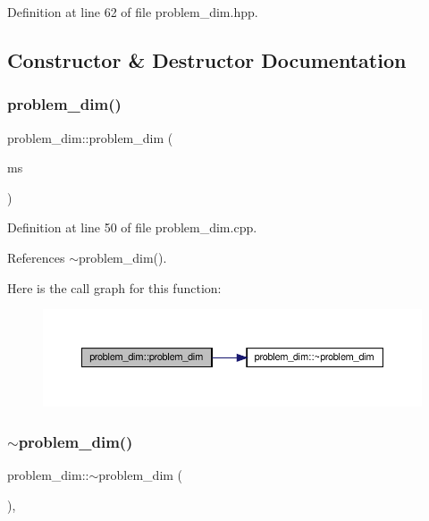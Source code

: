 Definition at line 62 of file problem\+\_\+dim.\+hpp.



\subsection{Constructor \& Destructor Documentation}
\mbox{\label{classproblem__dim_ac87600d07dd0aaa1b253baf90e987397}} 
\subsubsection{\texorpdfstring{problem\+\_\+dim()}{problem\_dim()}}
{\footnotesize\ttfamily problem\+\_\+dim\+::problem\+\_\+dim (\begin{DoxyParamCaption}\item[{meilp\+\_\+solver\+Ref}]{ms }\end{DoxyParamCaption})\hspace{0.3cm}{\ttfamily [explicit]}}



Definition at line 50 of file problem\+\_\+dim.\+cpp.



References $\sim$problem\+\_\+dim().

Here is the call graph for this function\+:
\nopagebreak
\begin{figure}[H]
\begin{center}
\leavevmode
\includegraphics[width=350pt]{d6/d56/classproblem__dim_ac87600d07dd0aaa1b253baf90e987397_cgraph}
\end{center}
\end{figure}
\mbox{\label{classproblem__dim_ae901efbb896887db42654cea94c2f72e}} 
\subsubsection{\texorpdfstring{$\sim$problem\+\_\+dim()}{~problem\_dim()}}
{\footnotesize\ttfamily problem\+\_\+dim\+::$\sim$problem\+\_\+dim (\begin{DoxyParamCaption}{ }\end{DoxyParamCaption})\hspace{0.3cm}{\ttfamily [virtual]}, {\ttfamily [default]}}



